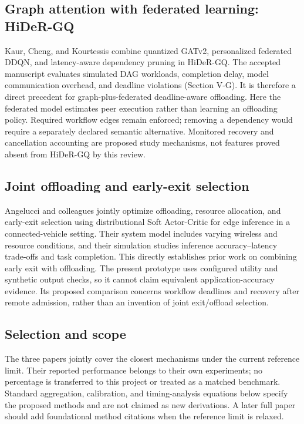 \documentclass[11pt,a4paper]{article}
\begin{document}
\subsection{Graph attention with federated learning: HiDeR-GQ}
Kaur, Cheng, and Kourtessis combine quantized GATv2, personalized federated
DDQN, and latency-aware dependency pruning in HiDeR-GQ\cite{kaur2025}.
The accepted manuscript evaluates simulated DAG workloads, completion delay,
model communication overhead, and deadline violations (Section V-G).
It is therefore a direct precedent for graph-plus-federated deadline-aware
offloading. Here the federated model estimates peer execution rather than
learning an offloading policy. Required workflow edges remain enforced;
removing a dependency would require a separately declared semantic alternative.
Monitored recovery and cancellation accounting are proposed study mechanisms,
not features proved absent from HiDeR-GQ by this review.

\subsection{Joint offloading and early-exit selection}
Angelucci and colleagues jointly optimize offloading, resource allocation,
and early-exit selection using distributional Soft Actor-Critic for edge
inference in a connected-vehicle setting\cite{angelucci2026}.
Their system model includes varying wireless and resource conditions,
and their simulation studies inference accuracy--latency trade-offs and
task completion. This directly establishes prior work on combining early
exit with offloading. The present prototype uses configured utility and
synthetic output checks, so it cannot claim equivalent application-accuracy
evidence. Its proposed comparison concerns workflow deadlines and recovery
after remote admission, rather than an invention of joint exit/offload selection.

\subsection{Selection and scope}
The three papers jointly cover the closest mechanisms under the current
reference limit. Their reported performance belongs to their own experiments;
no percentage is transferred to this project or treated as a matched benchmark.
Standard aggregation, calibration, and timing-analysis equations below specify
the proposed methods and are not claimed as new derivations. A later full paper
should add foundational method citations when the reference limit is relaxed.
\end{document}
